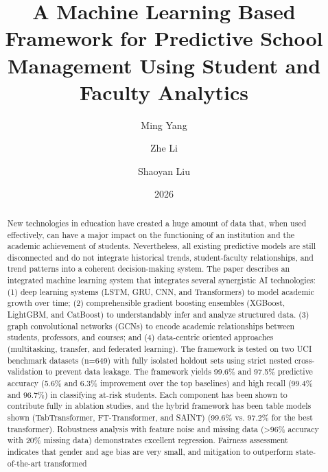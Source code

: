\documentclass[twocolumn]{svjour3}
\begin{document}
\title{A Machine Learning Based Framework for Predictive School Management Using Student and Faculty Analytics}
\author{Ming Yang \and Zhe Li \and Shaoyan Liu}
\date{2026}
\maketitle
\begin{abstract}
New technologies in education have created a huge amount of data that, when used effectively, can have a major impact on the functioning of an institution and the academic achievement of students. Nevertheless, all existing predictive models are still disconnected and do not integrate historical trends, student-faculty relationships, and trend patterns into a coherent decision-making system. The paper describes an integrated machine learning system that integrates several synergistic AI technologies: (1) deep learning systems (LSTM, GRU, CNN, and Transformers) to model academic growth over time; (2) comprehensible gradient boosting ensembles (XGBoost, LightGBM, and CatBoost) to understandably infer and analyze structured data. (3) graph convolutional networks (GCNs) to encode academic relationships between students, professors, and courses; and (4) data-centric oriented approaches (multitasking, transfer, and federated learning). The framework is tested on two UCI benchmark datasets (n=649) with fully isolated holdout sets using strict nested cross-validation to prevent data leakage. The framework yields 99.6\% and 97.5\% predictive accuracy (5.6\% and 6.3\% improvement over the top baselines) and high recall (99.4\% and 96.7\%) in classifying at-risk students. Each component has been shown to contribute fully in ablation studies, and the hybrid framework has been table models shown (TabTransformer, FT-Transformer, and SAINT) (99.6\% vs. 97.2\% for the best transformer). Robustness analysis with feature noise and missing data (>96\% accuracy with 20\% missing data) demonstrates excellent regression. Fairness assessment indicates that gender and age bias are very small, and mitigation 
to outperform 
state-of-the-art 
transformed
\end{abstract}
\end{document}
